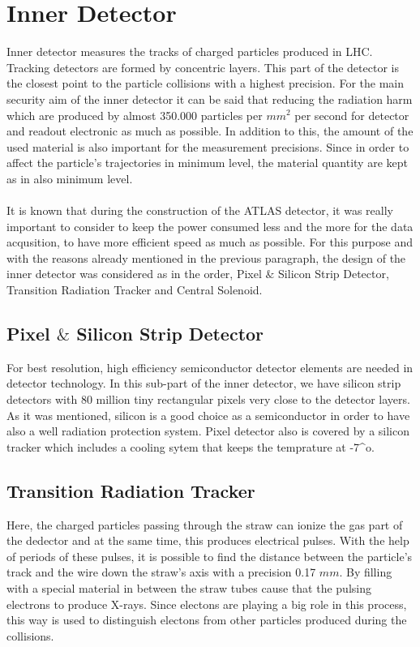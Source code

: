 \documentclass[a4paper,9pt]{article}
\begin{document}
\section{Inner Detector}
Inner detector measures the tracks of charged particles produced in LHC. Tracking detectors are formed by concentric layers. This part 
of the detector is the closest point to the particle collisions with a highest precision. For the main security aim of the inner detector
it can be said that reducing the radiation harm which are produced by almost 350.000 particles per ${mm}^2$ per second for detector and 
readout electronic as much as possible. In addition to this, the amount of the used material is also important for the
measurement precisions. Since in order to affect the particle's trajectories in minimum level, the material quantity are kept as in
also minimum level.
\\\\
It is known that during the construction of the ATLAS detector, it was really important to consider to keep the power consumed less
and the more for the data acqusition, to have more efficient speed as much as possible. For this purpose and with the reasons already
mentioned in the previous paragraph, the design of the inner detector was considered as in the order,
Pixel $\&$ Silicon Strip Detector, Transition Radiation Tracker and Central Solenoid.

\subsection{Pixel $\&$ Silicon Strip Detector}
For best resolution, high efficiency semiconductor detector elements are needed in detector technology. In this sub-part of the inner
detector, we have silicon strip detectors with 80 million tiny rectangular pixels very close to the detector layers. As it was mentioned,
silicon is a good choice as a semiconductor in order to have also a well radiation protection system. 
Pixel detector also is covered by a silicon tracker which includes a cooling sytem that keeps the temprature at -7^{o}.

\subsection{Transition Radiation Tracker}
Here, the charged particles passing through the straw can ionize the gas part of the dedector and at the same time, this produces electrical
pulses.  With the help of periods of these pulses, it is possible to find the distance between the particle's track and the wire down the 
straw's axis with a precision 0.17 $mm$. By filling with a special material in between the straw tubes cause that the pulsing electrons
to produce X-rays. Since electons are playing a big role in this process, this way is used to distinguish electons from other particles
produced during the collisions.
\end{document}
